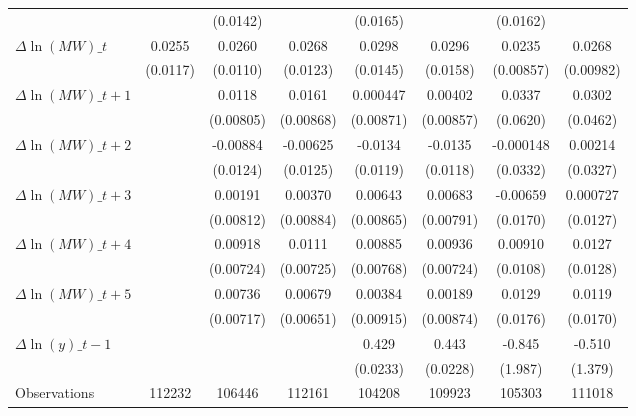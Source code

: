 {\begin{tabular}{l*{7}{c}}
          &                  & (0.0142)         &                  & (0.0165)         &                  & (0.0162)         &                  \\
[1em]
$\Delta \ln(MW)\_{t}$&   0.0255\sym{**} &   0.0260\sym{**} &   0.0268\sym{**} &   0.0298\sym{**} &   0.0296\sym{*}  &   0.0235\sym{***}&   0.0268\sym{***}\\
          & (0.0117)         & (0.0110)         & (0.0123)         & (0.0145)         & (0.0158)         &(0.00857)         &(0.00982)         \\
[1em]
$\Delta \ln(MW)\_{t+1}$&                  &   0.0118         &   0.0161\sym{*}  & 0.000447         &  0.00402         &   0.0337         &   0.0302         \\
          &                  &(0.00805)         &(0.00868)         &(0.00871)         &(0.00857)         & (0.0620)         & (0.0462)         \\
[1em]
$\Delta \ln(MW)\_{t+2}$&                  & -0.00884         & -0.00625         &  -0.0134         &  -0.0135         &-0.000148         &  0.00214         \\
          &                  & (0.0124)         & (0.0125)         & (0.0119)         & (0.0118)         & (0.0332)         & (0.0327)         \\
[1em]
$\Delta \ln(MW)\_{t+3}$&                  &  0.00191         &  0.00370         &  0.00643         &  0.00683         & -0.00659         & 0.000727         \\
          &                  &(0.00812)         &(0.00884)         &(0.00865)         &(0.00791)         & (0.0170)         & (0.0127)         \\
[1em]
$\Delta \ln(MW)\_{t+4}$&                  &  0.00918         &   0.0111         &  0.00885         &  0.00936         &  0.00910         &   0.0127         \\
          &                  &(0.00724)         &(0.00725)         &(0.00768)         &(0.00724)         & (0.0108)         & (0.0128)         \\
[1em]
$\Delta \ln(MW)\_{t+5}$&                  &  0.00736         &  0.00679         &  0.00384         &  0.00189         &   0.0129         &   0.0119         \\
          &                  &(0.00717)         &(0.00651)         &(0.00915)         &(0.00874)         & (0.0176)         & (0.0170)         \\
[1em]
$\Delta \ln(y)\_{t-1}$&                  &                  &                  &    0.429\sym{***}&    0.443\sym{***}&   -0.845         &   -0.510         \\
          &                  &                  &                  & (0.0233)         & (0.0228)         &  (1.987)         &  (1.379)         \\
\hline
Observations&   112232         &   106446         &   112161         &   104208         &   109923         &   105303         &   111018         \\
\hline\hline
\end{tabular}
}
